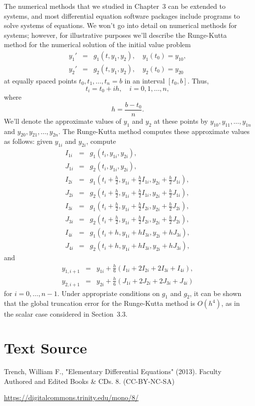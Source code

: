 \documentclass{ximera}
\begin{document}
The  numerical methods that we studied in
Chapter~3
can be extended to systems, and most differential equation software
packages include programs to solve systems of equations. We won't go
into detail on numerical methods for systems;     however, for
illustrative purposes we'll describe  the Runge-Kutta method for
the numerical solution of  the initial value problem
\begin{eqnarray*}
y_1'&=&g_1(t,y_1,y_2),\quad y_1(t_0)=y_{10},\\
y_2'&=&g_2(t,y_1,y_2),\quad y_2(t_0)=y_{20}
\end{eqnarray*}
at equally spaced points $t_0, t_1, \dots, t_n=b$ in an interval
$[t_0,b]$. Thus,
$$
t_i=t_0+ih,\quad i=0,1,\dots,n,
$$
where
$$
h=\frac{b-t_0}{n}.
$$
We'll denote the approximate values of $y_1$ and $y_2$ at these
points
by $y_{10},y_{11},\dots,y_{1n}$ and
 $y_{20},y_{21},\dots,y_{2n}$.
The Runge-Kutta method computes these approximate values as follows:
given $y_{1i}$ and $y_{2i}$, compute
\begin{eqnarray*}
I_{1i}&=&g_1(t_i,y_{1i},y_{2i}),\\
J_{1i}&=&g_2(t_i,y_{1i},y_{2i}),\\
I_{2i}&=&g_1\left(t_i+\frac{h}{2},y_{1i}+\frac{h}{2}I_{1i},y_{2i}+\frac{h}{2}J_{1i}\right),\\
J_{2i}&=&g_2\left(t_i+\frac{h}{2},y_{1i}+\frac{h}{2}I_{1i},y_{2i}+\frac{h}{2}J_{1i}\right),\\
I_{3i}&=&g_1\left(t_i+\frac{h}{2},y_{1i}+\frac{h}{2}I_{2i},y_{2i}+\frac{h}{2}J_{2i}\right),\\
J_{3i}&=&g_2\left(t_i+\frac{h}{2},y_{1i}+\frac{h}{2}I_{2i},y_{2i}+\frac{h}{2}J_{2i}\right),\\
I_{4i}&=&g_1(t_i+h,y_{1i}+hI_{3i},y_{2i}+hJ_{3i}),\\
J_{4i}&=&g_2(t_i+h,y_{1i}+hI_{3i},y_{2i}+hJ_{3i}),
\end{eqnarray*}
and
\begin{eqnarray*}
y_{1,i+1}&=&y_{1i}+\frac{h}{6}(I_{1i}+2I_{2i}+2I_{3i}+I_{4i}),\\
y_{2,i+1}&=&y_{2i}+\frac{h}{6}(J_{1i}+2J_{2i}+2J_{3i}+J_{4i})
\end{eqnarray*}
for $i=0, \dots, n-1$. Under appropriate conditions on $g_1$ and $g_2$,
it can be shown that the global truncation error for the Runge-Kutta
method is $O(h^4)$, as in the scalar case considered in
Section~3.3.



\section*{Text Source}
Trench, William F., "Elementary Differential Equations" (2013). Faculty Authored and Edited Books \& CDs. 8. (CC-BY-NC-SA)

\href{https://digitalcommons.trinity.edu/mono/8/}{https://digitalcommons.trinity.edu/mono/8/}
\end{document}
